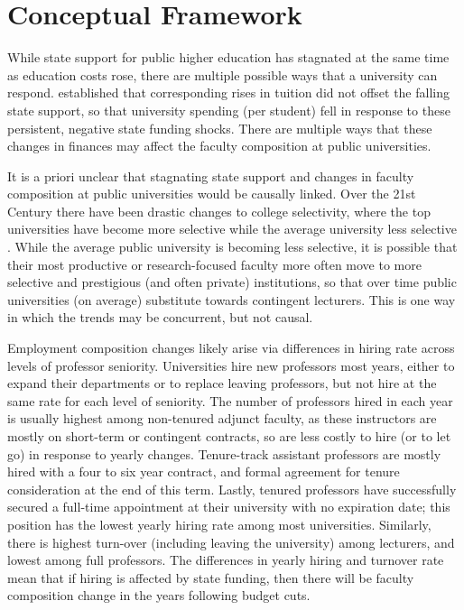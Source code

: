 \section{Conceptual Framework}
\label{sec:conceptual}

While state support for public higher education has stagnated at the same time as education costs rose, there are multiple possible ways that a university can respond.
\cite{NBERw23736} established that corresponding rises in tuition did not offset the falling state support, so that university spending (per student) fell in response to these persistent, negative state funding shocks.
There are multiple ways that these changes in finances may affect the faculty composition at public universities.

It is a priori unclear that stagnating state support and changes in faculty composition at public universities would be causally linked.
Over the 21st Century there have been drastic changes to college selectivity, where the top universities have become more selective while the average university less selective \citep{hoxby2009changing}.
While the average public university is becoming less selective, it is possible that their most productive or research-focused faculty more often move to more selective and prestigious (and often private) institutions, so that over time public universities (on average) substitute towards contingent lecturers. 
This is one way in which the trends may be concurrent, but not causal.

Employment composition changes likely arise via differences in hiring rate across levels of professor seniority.
Universities hire new professors most years, either to expand their departments or to replace leaving professors, but not hire at the same rate for each level of seniority.
The number of professors hired in each year is usually highest among non-tenured adjunct faculty, as these instructors are mostly on short-term or contingent contracts, so  are less costly to hire (or to let go) in response to yearly changes.
Tenure-track assistant professors are mostly hired with a four to six year contract, and formal agreement for tenure consideration at the end of this term.
Lastly, tenured professors have successfully secured a full-time appointment at their university with no expiration date; this position has the lowest yearly hiring rate among most universities.
Similarly, there is highest turn-over (including leaving the university) among lecturers, and lowest among full professors.
The differences in yearly hiring and turnover rate mean that if hiring is affected by state funding, then there will be faculty composition change in the years following budget cuts.

